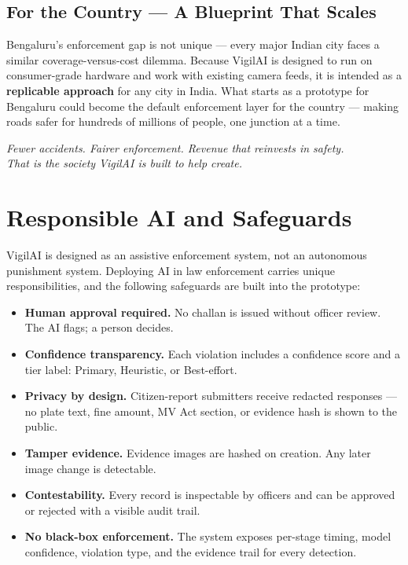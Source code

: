 \documentclass[11pt,a4paper]{article}
\newcommand{\sectionrule}{\noindent{\color{vigilaccent}\rule{0.22\linewidth}{2.2pt}}{\color{vigilaccent!30}\rule{0.78\linewidth}{0.6pt}}\par\vspace{4pt}}
\begin{document}
\subsection{For the Country — A Blueprint That Scales}

Bengaluru's enforcement gap is not unique — every major Indian city faces a similar coverage-versus-cost dilemma. Because VigilAI is designed to run on consumer-grade hardware and work with existing camera feeds, it is intended as a \textbf{replicable approach} for any city in India. What starts as a prototype for Bengaluru could become the default enforcement layer for the country — making roads safer for hundreds of millions of people, one junction at a time.

\vspace{6pt}
\begin{center}
\color{vigilaccent}\itshape
Fewer accidents. Fairer enforcement. Revenue that reinvests in safety.\\
That is the society VigilAI is built to help create.
\end{center}

\section{Responsible AI and Safeguards}
\sectionrule

VigilAI is designed as an assistive enforcement system, not an autonomous punishment system. Deploying AI in law enforcement carries unique responsibilities, and the following safeguards are built into the prototype:

\begin{itemize}
  \item \textbf{Human approval required.} No challan is issued without officer review. The AI flags; a person decides.
  \item \textbf{Confidence transparency.} Each violation includes a confidence score and a tier label: Primary, Heuristic, or Best-effort.
  \item \textbf{Privacy by design.} Citizen-report submitters receive redacted responses — no plate text, fine amount, MV Act section, or evidence hash is shown to the public.
  \item \textbf{Tamper evidence.} Evidence images are hashed on creation. Any later image change is detectable.
  \item \textbf{Contestability.} Every record is inspectable by officers and can be approved or rejected with a visible audit trail.
  \item \textbf{No black-box enforcement.} The system exposes per-stage timing, model confidence, violation type, and the evidence trail for every detection.
\end{itemize}
\end{document}
